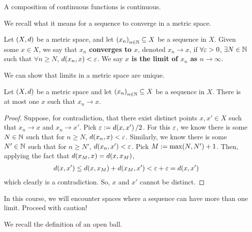 \begin{boxexercise}
    A composition of continuous functions is continuous.
\end{boxexercise}



We recall what it means for a sequence to converge in a metric space.

\begin{boxdefinition}
    Let $\left( X, d \right)$ be a metric space, and let $\left( x_n \right)_{n \in \mathbb{N}} \subseteq X$ be a sequence in $X$. Given some $x \in X$, we say that \textbf{$x_n$ converges to $x$}, denoted $x_n \to x$, if $\forall \varepsilon > 0$, $\exists N \in \mathbb{N}$ such that $\forall n \geq N$, $d\!\left( x_n, x \right) < \varepsilon$. We say \textbf{$x$ is the limit of $x_n$ as $n \to \infty$}.
\end{boxdefinition}

We can show that limits in a metric space are unique.

\begin{boxproposition}
    Let $\left( X, d \right)$ be a metric space and let $\left( x_n \right)_{n \in \mathbb{N}} \subseteq X$ be a sequence in $X$. There is at most one $x$ such that $x_n  \to x$.
\end{boxproposition}
\begin{proof}
    Suppose, for contradiction, that there exist distinct points $x, x' \in X$ such that $x_n \to x$ and $x_n \to x'$. Pick $\varepsilon := d\!\left( x, x' \right) / 2$. For this $\varepsilon$, we know there is some $N \in \mathbb{N}$ such that for $n \geq N$, $d\!\left( x_n, x \right) < \varepsilon$. Similarly, we know there is some $N' \in \mathbb{N}$ such that for $n \geq N'$, $d\!\left( x_n, x' \right) < \varepsilon$. Pick $M := \max\!\left( N, N' \right) + 1$. Then, applying the fact that $d\!\left( x_M, x \right) = d\!\left( x, x_M \right)$,
    \begin{align*}
        d\!\left( x, x' \right) \leq d\!\left( x, x_M \right) + d\!\left( x_M, x' \right) < \varepsilon + \varepsilon = d\!\left( x, x' \right)
    \end{align*}
    which clearly is a contradiction. So, $x$ and $x'$ cannot be distinct.
\end{proof}

\begin{boxwarning}
    In this course, we will encounter spaces where a sequence can have more than one limit. Proceed with caution!
\end{boxwarning}

We recall the definition of an open ball.

